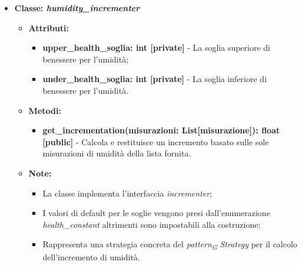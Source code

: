 \begin{itemize}
    \item{\textbf{Classe: \textit{humidity\_incrementer}}}
        \begin{itemize}
            \item\textbf{Attributi:}
            \begin{itemize}
                \item \textbf{upper\_health\_soglia: int [private]} - La soglia superiore di benessere per l'umidità;
                \item \textbf{under\_health\_soglia: int [private]} - La soglia inferiore di benessere per l'umidità.
            \end{itemize}
    \item \textbf{Metodi:}
        \begin{itemize}
            \item \textbf{get\_incrementation(misurazioni: List[misurazione]): float [public]} - Calcola e restituisce un incremento basato sulle sole misurazioni di umidità della lista fornita.
        \end{itemize}
    \item \textbf{Note:}
        \begin{itemize}
            \item La classe implementa l'interfaccia \textit{incrementer};
            \item I valori di default per le soglie vengono presi dall'enumerazione \textit{health\_constant} altrimenti sono impostabili alla costruzione;
            \item Rappresenta una strategia concreta del \textit{pattern}\textsubscript{\textit{G}} \textit{Strategy} per il calcolo dell'incremento di umidità.
        \end{itemize}
    \end{itemize}
    

\end{itemize}
